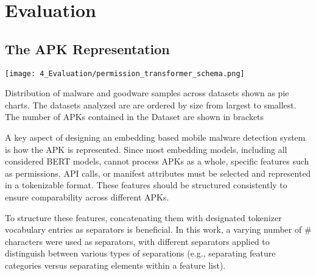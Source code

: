 \chapter{Evaluation}

\label{Evaluation} %


\section{The APK Representation}
\label{sec:apkrepresentation}

\begin{marginfigure}[3\baselineskip] %
    \center
    \texttt{[image: 4\_Evaluation/permission\_transformer\_schema.png]}
    \caption{\label{fig:permission_transformer_schema}
    Distribution of malware and goodware samples across datasets shown as pie charts.
    The datasets analyzed are are ordered by size from largest to smallest.
    The number of APKs contained in the Dataset are shown in brackets}
\end{marginfigure}

A key aspect of designing an embedding based mobile malware detection system is 
how the APK is represented. Since most embedding models, including all considered BERT models, 
cannot process APKs as a whole, specific features such as permissions, API calls, 
or manifest attributes must be selected and represented in a tokenizable format. 
These features should be structured consistently to ensure comparability across different APKs.

To structure these features, concatenating them with designated tokenizer vocabulary entries 
as separators is beneficial. 
In this work, a varying number of \# characters were used as separators, 
with different separators applied to distinguish between various types of separations 
(e.g., separating feature categories versus separating elements within a feature list).

